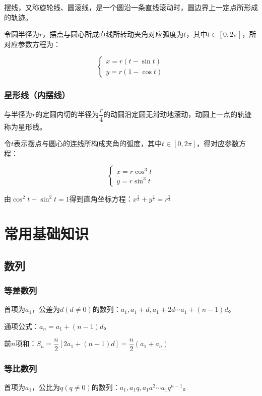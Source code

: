 \documentclass[UTF8, 12pt]{ctexart}
\begin{document}
摆线，又称旋轮线、圆滚线，是一个圆沿一条直线滚动时，圆边界上一定点所形成的轨迹。

令圆半径为$r$，摆点与圆心所成直线所转动夹角对应弧度为$t$，其中$t\in[0,2\pi]$，所对应参数方程为：

$$
    \left\{
    \begin{array}{lcl}
        x=r(t-\sin t) \\
        y=r(1-\cos t)
    \end{array}
    \right.
$$

\subsubsection{星形线（内摆线）}

与半径为$r$的定圆内切的半径为$\dfrac{r}{4}$的动圆沿定圆无滑动地滚动，动圆上一点的轨迹称为星形线。

令$t$表示摆点与圆心的连线所构成夹角的弧度，其中$t\in[0,2\pi]$，得对应参数方程：

$$
    \left\{
    \begin{array}{lcl}
        x=r\cos^3t \\
        y=r\sin^3t
    \end{array}
    \right.
$$

由$\cos^2t+\sin^2t=1$得到直角坐标方程：$x^{\frac{2}{3}}+y^{\frac{2}{3}}=r^{\frac{2}{3}}$

\section{常用基础知识}
\subsection{数列}
\subsubsection{等差数列}

首项为$a_1$，公差为$d(d\neq 0)$的数列：$a_1,a_1+d,a_1+2d\cdots a_1+(n-1)d$。

通项公式：$a_n=a_1+(n-1)d$。

前$n$项和：$S_n=\dfrac{n}{2}[2a_1+(n-1)d]=\dfrac{n}{2}(a_1+a_n)$

\subsubsection{等比数列}

首项为$a_1$，公比为$q(q\neq 0)$的数列：$a_1,a_1q,a_1a^2\cdots a_1q^{n-1}$。
\end{document}
